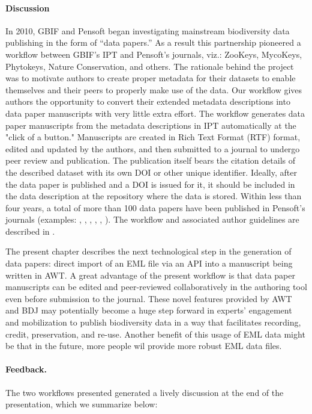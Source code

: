 \paragraph{Discussion} In 2010, GBIF and Pensoft began investigating mainstream biodiversity data publishing in the form of ``data papers.'' As a result this partnership pioneered a workflow between GBIF’s IPT and Pensoft’s journals, viz.: ZooKeys, MycoKeys, Phytokeys, Nature Conservation, and others. The rationale behind the project was to motivate authors to create proper metadata for their datasets to enable themselves and their peers to properly make use of the data. Our workflow gives authors the opportunity to convert their extended metadata descriptions into data paper manuscripts with very little extra effort. The workflow generates data paper manuscripts from the metadata descriptions in IPT automatically at the "click of a button." Manuscripts are created in Rich Text Format (RTF) format, edited and updated by the authors, and then submitted to a journal to undergo peer review and publication. The publication itself bears the citation details of the described dataset with its own DOI or other unique identifier. Ideally, after the data paper is published and a DOI is issued for it, it should be included in the data description at the repository where the data is stored. Within less than four years, a total of more than 100 data papers have been published in Pensoft's journals (examples: \cite{brosens_formidabel:_2013}, \cite{desmet_database_2013}, \cite{gutt_antarctic_2013}, \cite{pierrat_antarctic_2012}, \cite{shao_dataset_2012}, \cite{tng_vegetation_2016}). The workflow and associated author guidelines are described in \cite{penev_pensoft_2016}.

The present chapter describes the next technological step in the generation of data papers: direct import of an EML file via an API into a manuscript being written in AWT. A great advantage of the present workflow is that data paper manuscripts can be edited and peer-reviewed collaboratively in the authoring tool even before submission to the journal. These novel features provided by AWT and BDJ may potentially become a huge step forward in experts' engagement and mobilization to publish biodiversity data in a way that facilitates recording, credit, preservation, and re-use. Another benefit of this usage of EML data might be that in the future, more people wil provide more robust EML data files.

\paragraph{Feedback.} The two workflows presented generated a lively discussion at the end of the presentation, which we summarize below:

